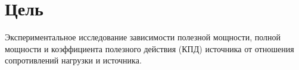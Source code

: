 \section*{Цель}

Экспериментальное исследование зависимости полезной
мощности, полной мощности и коэффициента полезного действия (КПД)
источника от отношения сопротивлений нагрузки и источника. 